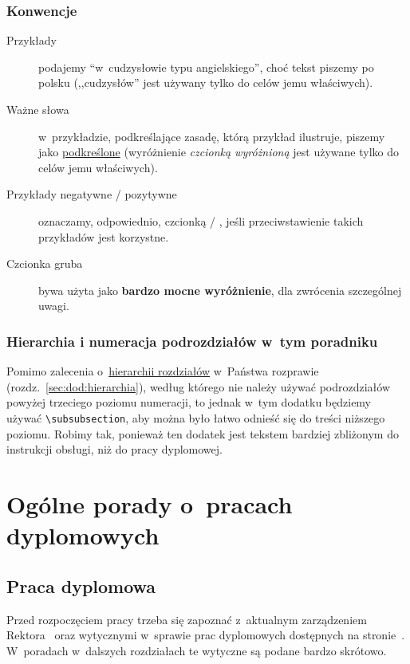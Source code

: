 \subsubsection{Konwencje}

\begin{description}
\item[Przykłady] podajemy ``w~cudzysłowie typu angielskiego'', choć tekst piszemy po polsku (,,cudzysłów'' jest używany tylko do celów jemu właściwych).
\item[Ważne słowa] w~przykładzie, podkreślające zasadę, którą przykład ilustruje, piszemy jako \underline{podkreślone} (wyróżnienie {\em czcionką wyróżnioną} jest używane tylko do celów jemu właściwych).
\item[Przykłady negatywne / pozytywne] oznaczamy, odpowiednio, czcionką  / , jeśli przeciwstawienie takich przykładów jest korzystne.
\item[Czcionka gruba] bywa użyta jako {\bf bardzo mocne wyróżnienie}, dla zwrócenia szczególnej uwagi.
\end{description}


\subsubsection{Hierarchia i numeracja podrozdziałów w~tym poradniku}
\label{sec:dod:hierarchia-w-poradniku}

Pomimo zalecenia o~\hyperref[sec:dod:hierarchia]{hierarchii rozdziałów} w~Państwa rozprawie (rozdz.~\ref{sec:dod:hierarchia}), według którego nie należy używać podrozdziałów powyżej trzeciego poziomu numeracji, to jednak w~tym dodatku będziemy używać {\tt \textbackslash{}subsubsection}, aby można było łatwo odnieść się do treści niższego poziomu. Robimy tak, ponieważ ten dodatek jest tekstem bardziej zbliżonym do instrukcji obsługi, niż do pracy dyplomowej.


\section{Ogólne porady o~pracach dyplomowych}
\label{sec:dod:ogolne-porady}

\subsection{Praca dyplomowa}
\label{sec:dod:ogolne-praca-dyplomowa}

Przed rozpoczęciem pracy trzeba się zapoznać z~aktualnym zarządzeniem Rektora~ oraz wytycznymi w~sprawie prac dyplomowych dostępnych na stronie~. W~poradach w~dalszych rozdziałach te wytyczne są podane bardzo skrótowo.

